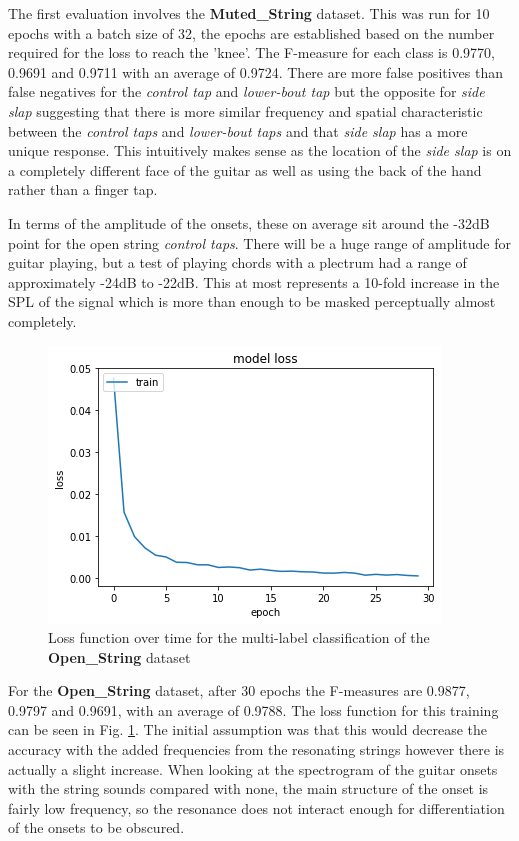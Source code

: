 \documentclass[conference]{IEEEtran}
\begin{document}
The first evaluation involves the \textbf{Muted\_String} dataset. This was run for 10 epochs with a batch size of 32, the epochs are established based on the number required for the loss to reach the 'knee'. 
The F-measure for each class is 0.9770, 0.9691 and 0.9711 with an average of 0.9724.
There are more false positives than false negatives for the \emph{control tap} and \emph{lower-bout tap} but the opposite for \emph{side slap} suggesting that there is more similar frequency and spatial characteristic
between the \emph{control taps} and \emph{lower-bout taps} and that \emph{side slap} has a more unique response. This intuitively makes sense as the location of the \emph{side slap} is on a completely different face of
the guitar as well as using the back of the hand rather than a finger tap. 

In terms of the amplitude of the onsets, these on average sit around the -32dB point for the open string \emph{control taps}. There will be a huge range of amplitude for guitar playing, but a test of playing chords 
with a plectrum had a range of approximately -24dB to -22dB. This at most represents a 10-fold increase in the SPL of the signal which is more than enough to be masked perceptually almost completely.

\begin{figure}[htbp]
    \centerline{\includegraphics[scale=0.4]{classif-open.png}}
    \caption{Loss function over time for the multi-label classification of the \textbf{Open\_String} dataset}
    \label{classif-open}
    \end{figure}

For the \textbf{Open\_String} dataset, after 30 epochs the F-measures are 0.9877, 0.9797 and 0.9691, with an average of 0.9788. The loss function for this training can be seen in Fig. \ref{classif-open}. The initial assumption was that this would decrease the accuracy
with the added frequencies from the resonating strings however there is actually a slight increase. When looking at the spectrogram of the guitar onsets with the string sounds compared with none,
the main structure of the onset is fairly low frequency, so the resonance does not interact enough for differentiation of the onsets to be obscured.
\end{document}
